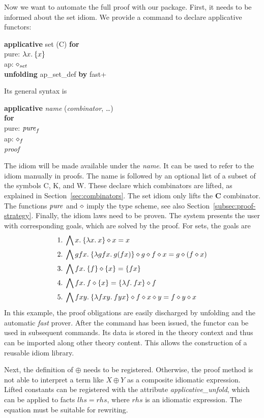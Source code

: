 Now we want to automate the full proof with our package.
First, it needs to be informed about the set idiom.
We provide a command to declare applicative functors:
\begin{isabelle}
	\textbf{applicative} set (C)
	\textbf{for} \\
	\iindent pure: $\lambda x.\>\{x\}$ \\
	\iindent ap: $\diamond_\mathit{set}$ \\
	\textbf{unfolding} ap\_set\_def \textbf{by} fast+
\end{isabelle}
Its general syntax is
\begin{isabelle}
	\textbf{applicative} \textit{name} (\textit{combinator}, \dots) \\
	\textbf{for} \\
	\iindent pure: $\operatorname{\mathit{pure}}_f$\\
	\iindent ap: $\diamond_f$ \\
	\textit{proof}
\end{isabelle}
The idiom will be made available under the \textit{name}.
It can be used to refer to the idiom manually in proofs.
The name is followed by an optional list of a subset of the symbols C, K, and W.
These declare which combinators are lifted, as explained in
Section~\ref{sec:combinators}.
The set idiom only lifts the $\mathbf{C}$ combinator.
The functions $\operatorname{\mathit{pure}}$ and $\diamond$ imply the type scheme, see also
Section~\ref{subsec:proof-strategy}.
Finally, the idiom laws need to be proven.
The system presents the user with corresponding goals, which are solved by the
proof.
For sets, the goals are
\begin{align*}
1.\; & \bigwedge x.\> \{\lambda x.\>x\} \diamond x = x \\
2.\; & \bigwedge g f x.\> \{\lambda g f x.\>g (f x)\} \diamond g \diamond f \diamond x = g \diamond (f \diamond x) \\
3.\; & \bigwedge f x.\> \{f\} \diamond \{x\} = \{f x\} \\
4.\; & \bigwedge f x.\> f \diamond \{x\} = \{\lambda f.\>f x\} \diamond f \\
5.\; & \bigwedge f x y.\> \{\lambda f x y.\>f y x\} \diamond f \diamond x \diamond y = f \diamond y \diamond x
\end{align*}
In this example, the proof obligations are easily discharged by unfolding and
the automatic \emph{fast} prover.
After the command has been issued, the functor can be used in subsequent
commands.
Its data is stored in the theory context and thus can be imported along other
theory content.
This allows the construction of a reusable idiom library.

Next, the definition of $\oplus$ needs to be registered.
Otherwise, the proof method is not able to interpret a term like $X \oplus Y$ as
a composite idiomatic expression.
Lifted constants can be registered with the attribute \emph{applicative\_unfold},
which can be applied to facts $\mathit{lhs} = \mathit{rhs}$, where $\mathit{rhs}$
is an idiomatic expression.
The equation must be suitable for rewriting.

